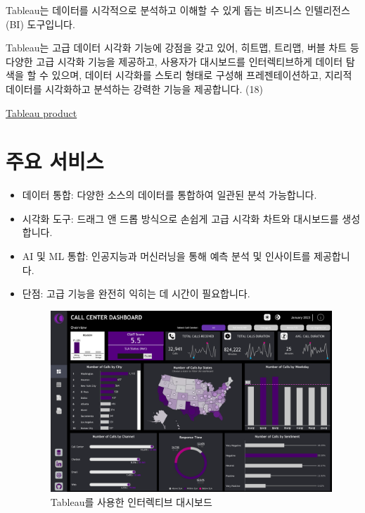 \documentclass[
  letterpaper,
]{book}
\begin{document}
Tableau는 데이터를 시각적으로 분석하고 이해할 수 있게 돕는 비즈니스
인텔리전스(BI) 도구입니다.

Tableau는 고급 데이터 시각화 기능에 강점을 갖고 있어, 히트맵, 트리맵,
버블 차트 등 다양한 고급 시각화 기능을 제공하고, 사용자가 대시보드를
인터렉티브하게 데이터 탐색을 할 수 있으며, 데이터 시각화를 스토리 형태로
구성해 프레젠테이션하고, 지리적 데이터를 시각화하고 분석하는 강력한
기능을 제공합니다. (18)

\href{https://www.tableau.com/ko-kr/products/tableau}{Tableau product}

\section{주요 서비스}\label{uxc8fcuxc694-uxc11cuxbe44uxc2a4-2}

\begin{itemize}
\item
  데이터 통합: 다양한 소스의 데이터를 통합하여 일관된 분석 가능합니다.
\item
  시각화 도구: 드래그 앤 드롭 방식으로 손쉽게 고급 시각화 차트와
  대시보드를 생성합니다.
\item
  AI 및 ML 통합: 인공지능과 머신러닝을 통해 예측 분석 및 인사이트를
  제공합니다.
\item
  단점: 고급 기능을 완전히 익히는 데 시간이 필요합니다.

  \begin{figure}[H]

  {\centering \includegraphics{img/fig19.png}

  }

  \caption{Tableau를 사용한 인터렉티브 대시보드}

  \end{figure}%
\end{itemize}
\end{document}
